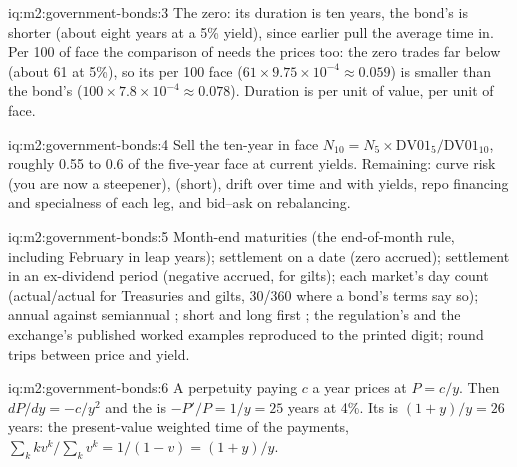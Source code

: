 \begin{solution}{iq:m2:government-bonds:3}
The zero: its duration is ten years, the  bond's is shorter (about
eight years at a 5\% yield), since earlier  pull the average time in.
Per 100 of face the comparison of  needs the prices too: the zero trades
far below  (about 61 at 5\%), so its  per 100 face ($61 \times 9.75 \times
10^{-4} \approx 0.059$) is smaller than the  bond's ($100 \times 7.8 \times
10^{-4} \approx 0.078$). Duration is per unit of value,  per unit of face.
\end{solution}

\begin{solution}{iq:m2:government-bonds:4}
Sell the ten-year in face $N_{10} = N_5 \times \mathrm{DV01}_5/\mathrm{DV01}_{10}$,
roughly 0.55 to 0.6 of the five-year face at current yields. Remaining:
curve risk (you are now a steepener),  (short),  drift over time
and with yields, repo financing and specialness of each leg, and bid--ask on
rebalancing.
\end{solution}

\begin{solution}{iq:m2:government-bonds:5}
Month-end maturities (the end-of-month rule, including February in leap
years); settlement on a  date (zero accrued); settlement in an
ex-dividend period (negative accrued, for gilts); each market's day count
(actual/actual for Treasuries and gilts, 30/360 where a bond's terms say
so);
annual against semiannual ; short and long first ; the
regulation's and the exchange's published worked examples reproduced to the
printed digit; round trips between price and yield.
\end{solution}

\begin{solution}{iq:m2:government-bonds:6}
A perpetuity paying $c$ a year prices at $P = c/y$. Then $dP/dy = -c/y^2$ and
the  is $-P'/P = 1/y = 25$ years at 4\%. Its 
is $(1 + y)/y = 26$ years: the present-value weighted time of the payments,
$\sum_k k v^k / \sum_k v^k = 1/(1 - v) = (1+y)/y$.
\end{solution}
